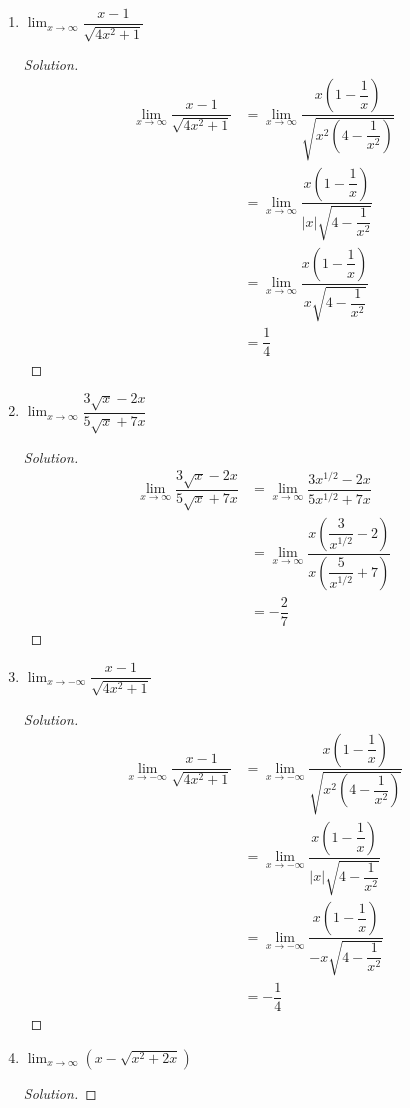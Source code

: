 \documentclass[12pt]{article}
\newenvironment{solution}{\begin{proof}[Solution]}{\end{proof}}
\begin{document}
\begin{enumerate}
\begin{enumerate}
\begin{solution}
			\end{solution}
			\item $\displaystyle{\lim_{x\to\infty} \dfrac{x-1}{\sqrt{4x^2+1}}}$
			\begin{solution}
				\begin{align*}
					\displaystyle{\lim_{x\to\infty} \dfrac{x-1}{\sqrt{4x^2+1}}}&= \displaystyle{\lim_{x\to\infty} \dfrac{x(1-\dfrac{1}{x})}{\sqrt{x^2(4-\dfrac{1}{x^2})}}}\\
					&= \displaystyle{\lim_{x\to\infty} \dfrac{x(1-\dfrac{1}{x})}{|x|\sqrt{4-\dfrac{1}{x^2}}}}\\
					&= \displaystyle{\lim_{x\to\infty} \dfrac{x(1-\dfrac{1}{x})}{x\sqrt{4-\dfrac{1}{x^2}}}}\\
					&= \dfrac{1}{4}
				\end{align*}
			\end{solution}
			\item $\displaystyle{\lim_{x\to \infty}\dfrac{3\sqrt{x}-2x}{5\sqrt{x}+7x}}$
			\begin{solution}
				\begin{align*}
					\displaystyle{\lim_{x\to\infty}\dfrac{3\sqrt{x}-2x}{5\sqrt{x}+7x}} &=
					\displaystyle{\lim_{x\to\infty}\dfrac{3x^{1/2}-2x}{5x^{1/2}+7x}}\\
					&= \displaystyle{\lim_{x\to\infty} \dfrac{x(\dfrac{3}{x^{1/2}}-2)}{x(\dfrac{5}{x^{1/2}}+7)}}\\
					&=-\dfrac{2}{7}
				\end{align*}
			\end{solution}
			\item $\displaystyle{\lim_{x\to-\infty} \dfrac{x-1}{\sqrt{4x^2+1}}}$
			\begin{solution}
				\begin{align*}
					\displaystyle{\lim_{x\to-\infty} \dfrac{x-1}{\sqrt{4x^2+1}}}&= \displaystyle{\lim_{x\to-\infty} \dfrac{x(1-\dfrac{1}{x})}{\sqrt{x^2(4-\dfrac{1}{x^2})}}}\\
					&= \displaystyle{\lim_{x\to-\infty} \dfrac{x(1-\dfrac{1}{x})}{|x|\sqrt{4-\dfrac{1}{x^2}}}}\\
					&= \displaystyle{\lim_{x\to-\infty} \dfrac{x(1-\dfrac{1}{x})}{-x\sqrt{4-\dfrac{1}{x^2}}}}\\
					&= -\dfrac{1}{4}
				\end{align*}
			\end{solution}
			\item $\displaystyle{\lim_{x\to\infty} (x-\sqrt{x^2+2x})}$
			\begin{solution}

\end{solution}
\end{enumerate}
\end{enumerate}
\end{document}
